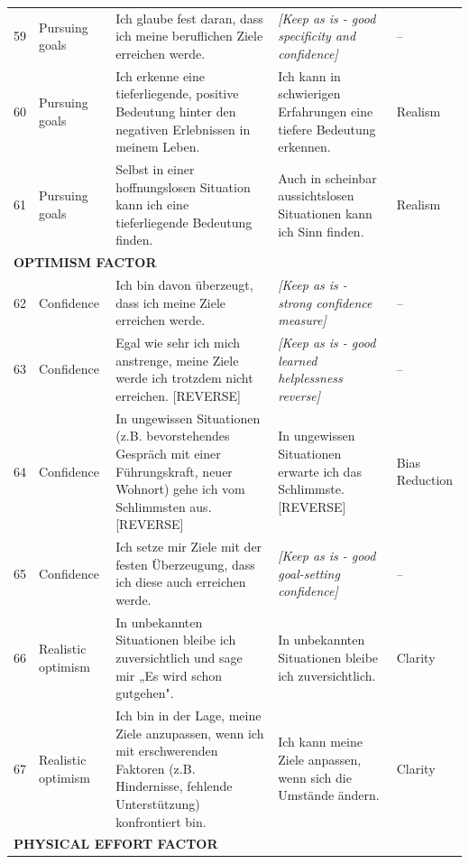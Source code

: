 \documentclass[12pt,a4paper]{article}
\begin{document}
\begin{longtable}{p{}p{}p{}p{}p{}}
59 & Pursuing goals & Ich glaube fest daran, dass ich meine beruflichen Ziele erreichen werde. & \textit{[Keep as is - good specificity and confidence]} & -- \\

60 & Pursuing goals & Ich erkenne eine tieferliegende, positive Bedeutung hinter den negativen Erlebnissen in meinem Leben. & Ich kann in schwierigen Erfahrungen eine tiefere Bedeutung erkennen. & Realism \\

61 & Pursuing goals & Selbst in einer hoffnungslosen Situation kann ich eine tieferliegende Bedeutung finden. & Auch in scheinbar aussichtslosen Situationen kann ich Sinn finden. & Realism \\

\midrule
\multicolumn{5}{l}{\textbf{OPTIMISM FACTOR}} \\
\midrule

62 & Confidence & Ich bin davon überzeugt, dass ich meine Ziele erreichen werde. & \textit{[Keep as is - strong confidence measure]} & -- \\

63 & Confidence & Egal wie sehr ich mich anstrenge, meine Ziele werde ich trotzdem nicht erreichen. [REVERSE] & \textit{[Keep as is - good learned helplessness reverse]} & -- \\

64 & Confidence & In ungewissen Situationen (z.B. bevorstehendes Gespräch mit einer Führungskraft, neuer Wohnort) gehe ich vom Schlimmsten aus. [REVERSE] & In ungewissen Situationen erwarte ich das Schlimmste. [REVERSE] & Bias Reduction \\

65 & Confidence & Ich setze mir Ziele mit der festen Überzeugung, dass ich diese auch erreichen werde. & \textit{[Keep as is - good goal-setting confidence]} & -- \\

66 & Realistic optimism & In unbekannten Situationen bleibe ich zuversichtlich und sage mir „Es wird schon gutgehen". & In unbekannten Situationen bleibe ich zuversichtlich. & Clarity \\

67 & Realistic optimism & Ich bin in der Lage, meine Ziele anzupassen, wenn ich mit erschwerenden Faktoren (z.B. Hindernisse, fehlende Unterstützung) konfrontiert bin. & Ich kann meine Ziele anpassen, wenn sich die Umstände ändern. & Clarity \\

\midrule
\multicolumn{5}{l}{\textbf{PHYSICAL EFFORT FACTOR}} \\
\midrule


\end{longtable}
\end{document}

